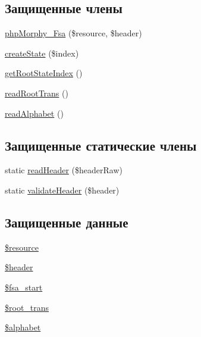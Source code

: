 \subsection*{Защищенные члены}
\begin{DoxyCompactItemize}
\item 
\hyperlink{classphpMorphy__Fsa_a70e1d1978abfd06a3805870674ea8ef2}{phpMorphy\_\-Fsa} (\$resource, \$header)
\item 
\hyperlink{classphpMorphy__Fsa_aa4196900527053728cc90cae72391d90}{createState} (\$index)
\item 
\hyperlink{classphpMorphy__Fsa_a25f03d8aa0e34aac0a6e7b5801d051c4}{getRootStateIndex} ()
\item 
\hyperlink{classphpMorphy__Fsa_af1029e3af5c917162c2edbf5ab728768}{readRootTrans} ()
\item 
\hyperlink{classphpMorphy__Fsa_a23aeca4ba49eba9967b4624017ec5256}{readAlphabet} ()
\end{DoxyCompactItemize}
\subsection*{Защищенные статические члены}
\begin{DoxyCompactItemize}
\item 
static \hyperlink{classphpMorphy__Fsa_a2eff275f71bc526928dbcd8b69a0bc59}{readHeader} (\$headerRaw)
\item 
static \hyperlink{classphpMorphy__Fsa_a271549a73b003e166f688ad2dc8ba58d}{validateHeader} (\$header)
\end{DoxyCompactItemize}
\subsection*{Защищенные данные}
\begin{DoxyCompactItemize}
\item 
\hyperlink{classphpMorphy__Fsa_a6da96ac3059de2cea2527517aad7c046}{\$resource}
\item 
\hyperlink{classphpMorphy__Fsa_a50ab92c73a0c3c2216d85133739fc7e5}{\$header}
\item 
\hyperlink{classphpMorphy__Fsa_add5090376083f570d613bccdf81b207c}{\$fsa\_\-start}
\item 
\hyperlink{classphpMorphy__Fsa_a1b2d07e78560d45d7cc2d57098259e39}{\$root\_\-trans}
\item 
\hyperlink{classphpMorphy__Fsa_ad6d89b8764e576b3e9c7fd6370d2c239}{\$alphabet}
\end{DoxyCompactItemize}


